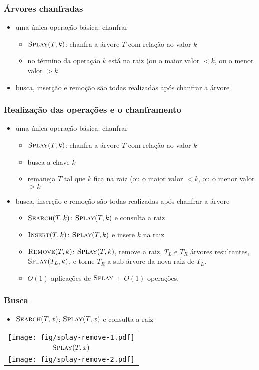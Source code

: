 \documentclass{beamer}
\begin{document}
\begin{frame}
\frametitle{Árvores chanfradas}

\begin{itemize}
\item uma única operação básica: chanfrar
\begin{itemize}
\item $\textnormal{\scshape Splay}(T, k)$: chanfra a árvore $T$ com relação ao valor $k$
\item no término da operação $k$ está na raiz (ou o maior valor $< k$,
ou o menor valor $> k$
\end{itemize}
\item busca, inserção e remoção são todas realizadas após chanfrar a árvore
\end{itemize}
\end{frame}

\begin{frame}
\frametitle{Realização das operações e o chanframento}

\begin{itemize}
\item uma única operação básica: chanfrar
\begin{itemize}
\item $\textnormal{\scshape Splay}(T, k)$: chanfra a árvore $T$ com relação ao valor $k$
\item busca a chave $k$
\item remaneja $T$ tal que $k$ fica na raiz (ou o maior valor $< k$,
ou o menor valor $> k$
\end{itemize}
\item busca, inserção e remoção são todas realizadas após chanfrar a árvore
\begin{itemize}
\item $\textnormal{\scshape Search}(T, k)$: $\textnormal{\scshape Splay}(T, k)$ e consulta a raiz
\item $\textnormal{\scshape Insert}(T, k)$: $\textnormal{\scshape Splay}(T, k)$ e insere $k$ na raiz
\item $\textnormal{\scshape Remove}(T, k)$: $\textnormal{\scshape Splay}(T, k)$, remove a raiz, $T_L$ e $T_R$ árvores resultantes, $\textnormal{\scshape Splay}(T_L, k)$, e torne $T_R$ a sub-árvore da nova raiz de $T_L$.
\item $O(1)$ aplicações de $\textnormal{\scshape Splay}$ + $O(1)$ operações.
\end{itemize}
\end{itemize}
\end{frame}

\begin{frame}
\frametitle{Busca}

\begin{itemize}
\item $\textnormal{\scshape Search}(T, x)$: $\textnormal{\scshape Splay}(T, x)$ e consulta a raiz
\end{itemize}

\begin{tabular}{c}
\texttt{[image: fig/splay-remove-1.pdf]} \pause \\
$\textnormal{\scshape Splay}(T, x)$ \pause \\
\texttt{[image: fig/splay-remove-2.pdf]}
\end{tabular}

\end{frame}
\end{document}
